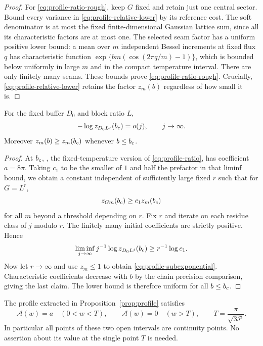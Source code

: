 \begin{proof}
For \eqref{eq:profile-ratio-rough}, keep $G$ fixed and retain just one
central sector. Bound every variance in
\eqref{eq:profile-relative-lower} by its reference cost. The soft
denominator is at most the fixed finite-dimensional Gaussian lattice
sum, since all its characteristic factors are at most one. The
selected seam factor has a uniform positive lower bound: a mean over
$m$ independent Bessel increments at fixed flux $q$ has
characteristic function
$\exp\{bm(\cos(2\pi q/m)-1)\}$, which is bounded below uniformly
in large $m$ and in the compact temperature interval. There are only
finitely many seams. These bounds prove \eqref{eq:profile-ratio-rough}.
Crucially, \eqref{eq:profile-relative-lower} retains the factor
$z_m(b)$ regardless of how small it is.
\end{proof}

\begin{lemma}
\label{lem:profile-subexponential}
For the fixed buffer $D_0$ and block ratio $L$,
\begin{equation}\label{eq:profile-subexponential}
 -\log z_{D_0L^j}(b_c)=o(j),\qquad j\to\infty.
\end{equation}
Moreover $z_m(b)\ge z_m(b_c)$ whenever $b\le b_c$.
\end{lemma}

\begin{proof}
At $b_c$, \cite[Equation~(2.15)]{X}, the fixed-temperature version
of \eqref{eq:profile-ratio}, has coefficient $a=8\pi$. Taking $c_1$ to be the smaller of $1$ and half the prefactor in that
liminf bound, we obtain a constant independent of sufficiently large
fixed $r$ such that
for $G=L^r$,
\[
 z_{Gm}(b_c)\ge c_1z_m(b_c)
\]
for all $m$ beyond a threshold depending on $r$. Fix $r$ and iterate
on each residue class of $j$ modulo $r$. The finitely many initial
coefficients are strictly positive. Hence
\[
 \liminf_{j\to\infty}j^{-1}\log z_{D_0L^j}(b_c)
                                      \ge r^{-1}\log c_1.
\]
Now let $r\to\infty$ and use $z_m\le1$ to obtain
\eqref{eq:profile-subexponential}. Characteristic coefficients
decrease with $b$ by the chain precision comparison, giving the last
claim. The lower bound is therefore uniform for all $b\le b_c$.
\end{proof}

\begin{proposition}
\label{prop:profile-step}
The profile extracted in Proposition~\ref{prop:profile} satisfies
\begin{equation}\label{eq:profile-step}
 \mathcal A(w)=a\quad(0<w<T),\qquad
 \mathcal A(w)=0\quad(w>T),
 \qquad T=\frac{\pi}{\sqrt{3\mathcal P}}.
\end{equation}
In particular all points of these two open intervals are continuity
points. No assertion about its value at the single point $T$ is
needed.
\end{proposition}

